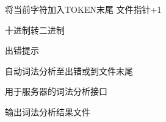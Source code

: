 \documentclass[letterpaper,10pt,english]{sphinxmanual}
\begin{document}
\begin{fulllineitems}
\begin{fulllineitems}
\label{\detokenize{lexer/lexer:lexer.lexer.C0lexer.getchar}}
将当前字符加入TOKEN末尾
文件指针+1

\end{fulllineitems}


\begin{fulllineitems}
\label{\detokenize{lexer/lexer:lexer.lexer.C0lexer.tobin}}
十进制转二进制

\end{fulllineitems}


\begin{fulllineitems}
\label{\detokenize{lexer/lexer:lexer.lexer.C0lexer.error}}
出错提示

\end{fulllineitems}


\begin{fulllineitems}
\label{\detokenize{lexer/lexer:lexer.lexer.C0lexer.word_analyze}}
自动词法分析至出错或到文件末尾

\end{fulllineitems}


\begin{fulllineitems}
\label{\detokenize{lexer/lexer:lexer.lexer.C0lexer.web_word_analyze}}
用于服务器的词法分析接口

\end{fulllineitems}


\begin{fulllineitems}
\label{\detokenize{lexer/lexer:lexer.lexer.C0lexer.output}}
输出词法分析结果文件

\end{fulllineitems}


\end{fulllineitems}
\end{document}
